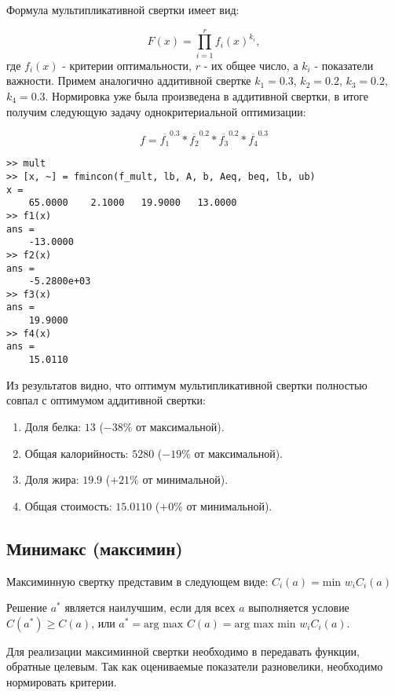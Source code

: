 Формула мультипликативной свертки имеет вид:

$$
F(x) = \prod_{i=1}^{r} f_i(x)^{k_i},
$$
где $f_i(x)$ - критерии оптимальности, $r$ - их общее число, а $k_i$ - показатели важности. Примем аналогично аддитивной свертке $k_1 = 0.3$, $k_2 = 0.2$, $k_3 = 0.2$, $k_4 = 0.3$. Нормировка уже была произведена в аддитивной свертки, в итоге получим следующую задачу однокритериальной оптимизации:

$$
f = \overline{f_1}^{0.3} * \overline{f_2}^{0.2} * \overline{f_3}^{0.2} * \overline{f_4}^{0.3}
$$



\begin{lstlisting}[caption=\code{Console}]
>> mult
>> [x, ~] = fmincon(f_mult, lb, A, b, Aeq, beq, lb, ub)
x =
	65.0000    2.1000   19.9000   13.0000
>> f1(x)
ans =
	-13.0000
>> f2(x)
ans =
	-5.2800e+03
>> f3(x)
ans =
	19.9000
>> f4(x)
ans =
	15.0110
\end{lstlisting}

Из результатов видно, что оптимум мультипликативной свертки полностью совпал с оптимумом аддитивной свертки:

\begin{enumerate}
	\item Доля белка: $13$ ($-38\%$ от максимальной).
	\item Общая калорийность: $5280$ ($-19\%$ от максимальной).
	\item Доля жира: $19.9$ ($+21\%$ от минимальной).
	\item Общая стоимость: $15.0110$ ($+0\%$ от минимальной).
\end{enumerate}

\subsection{Минимакс (максимин)}

Максиминную свертку представим в следующем виде: $C_i(a)= \text{min } w_i C_i(a)$

Решение $a^*$ является наилучшим, если для всех $a$ выполняется условие $C(a^*) \geq C(a)$, или $a^* = \text{arg max } C(a) = \text{arg max min } w_i C_i (a)$.

Для реализации максиминной свертки необходимо в  передавать функции, обратные целевым. Так как оцениваемые показатели разновелики, необходимо нормировать критерии.



